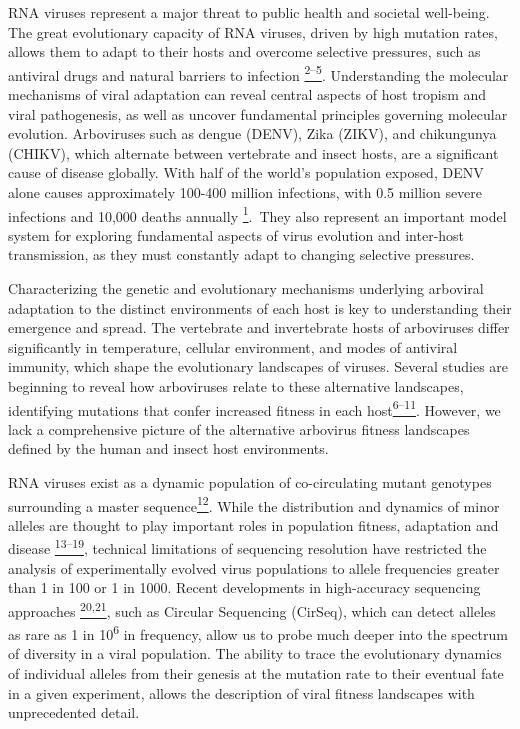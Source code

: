 \documentclass[
]{article}
\begin{document}
RNA viruses represent a major threat to public health and societal
well-being. The great evolutionary capacity of RNA viruses, driven by
high mutation rates, allows them to adapt to their hosts and overcome
selective pressures, such as antiviral drugs and natural barriers to
infection
\href{https://paperpile.com/c/REZjPf/9TgsM+8nuz1+tRYDR+L1Afo}{\textsuperscript{2--5}}.
Understanding the molecular mechanisms of viral adaptation can reveal
central aspects of host tropism and viral pathogenesis, as well as
uncover fundamental principles governing molecular evolution.
Arboviruses such as dengue (DENV), Zika (ZIKV), and chikungunya (CHIKV),
which alternate between vertebrate and insect hosts, are a significant
cause of disease globally. With half of the world's population exposed,
DENV alone causes approximately 100-400 million infections, with 0.5
million severe infections and 10,000 deaths annually
\href{https://paperpile.com/c/REZjPf/Nx7yi}{\textsuperscript{1}}.~They
also represent an important model system for exploring fundamental
aspects of virus evolution and inter-host transmission, as they must
constantly adapt to changing selective pressures.

Characterizing the genetic and evolutionary mechanisms underlying
arboviral adaptation to the distinct environments of each host is key to
understanding their emergence and spread. The vertebrate and
invertebrate hosts of arboviruses differ significantly in temperature,
cellular environment, and modes of antiviral immunity, which shape the
evolutionary landscapes of viruses. Several studies are beginning to
reveal how arboviruses relate to these alternative landscapes,
identifying mutations that confer increased fitness in each
host\href{https://paperpile.com/c/REZjPf/mlDyr+r0H6+erQn1+mYIl+uzXme+XqhpA}{\textsuperscript{6--11}}.
However, we lack a comprehensive picture of the alternative arbovirus
fitness landscapes defined by the human and insect host environments.

RNA viruses exist as a dynamic population of co-circulating mutant
genotypes surrounding a master
sequence\href{https://paperpile.com/c/REZjPf/fySKT}{\textsuperscript{12}}.
While the distribution and dynamics of minor alleles are thought to play
important roles in population fitness, adaptation and disease
\href{https://paperpile.com/c/REZjPf/kVUH4+ETeaC+lp4YG+iU0v6+f5vgZ+zRVIk+vDnrd}{\textsuperscript{13--19}},
technical limitations of sequencing resolution have restricted the
analysis of experimentally evolved virus populations to allele
frequencies greater than 1 in 100 or 1 in 1000. Recent developments in
high-accuracy sequencing approaches
\href{https://paperpile.com/c/REZjPf/bczFl+CObqp}{\textsuperscript{20,21}},
such as Circular Sequencing (CirSeq), which can detect alleles as rare
as 1 in 10\textsuperscript{6} in frequency, allow us to probe much
deeper into the spectrum of diversity in a viral population. The ability
to trace the evolutionary dynamics of individual alleles from their
genesis at the mutation rate to their eventual fate in a given
experiment, allows the description of viral fitness landscapes with
unprecedented detail.
\end{document}
